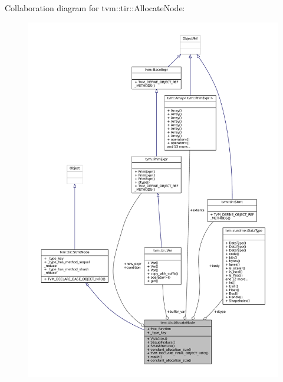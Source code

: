 Collaboration diagram for tvm\+:\+:tir\+:\+:Allocate\+Node\+:
\nopagebreak
\begin{figure}[H]
\begin{center}
\leavevmode
\includegraphics[width=350pt]{classtvm_1_1tir_1_1AllocateNode__coll__graph}
\end{center}
\end{figure}
